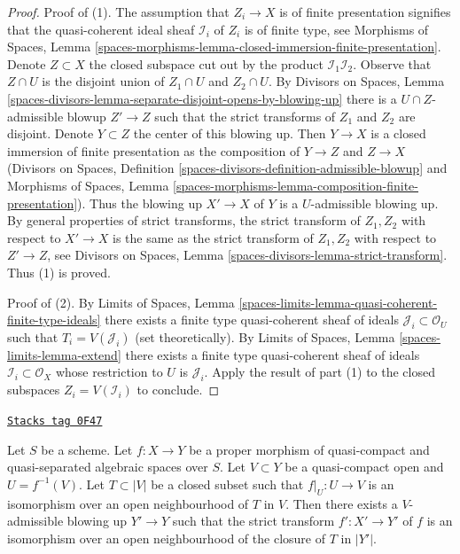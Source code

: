 \begin{proof}
Proof of (1). The assumption that $Z_i \to X$ is of finite presentation
signifies that the quasi-coherent ideal sheaf $\mathcal{I}_i$ of $Z_i$
is of finite type, see
Morphisms of Spaces, Lemma
\ref{spaces-morphisms-lemma-closed-immersion-finite-presentation}.
Denote $Z \subset X$ the closed subspace
cut out by the product $\mathcal{I}_1 \mathcal{I}_2$.
Observe that $Z \cap U$ is the disjoint union
of $Z_1 \cap U$ and $Z_2 \cap U$. By Divisors on Spaces, Lemma
\ref{spaces-divisors-lemma-separate-disjoint-opens-by-blowing-up}
there is a $U \cap Z$-admissible blowup $Z' \to Z$ such that
the strict transforms of $Z_1$ and $Z_2$ are disjoint.
Denote $Y \subset Z$ the center of this blowing up.
Then $Y \to X$ is a closed immersion of finite presentation as the composition
of $Y \to Z$ and $Z \to X$ (Divisors on Spaces, Definition
\ref{spaces-divisors-definition-admissible-blowup} and
Morphisms of Spaces, Lemma
\ref{spaces-morphisms-lemma-composition-finite-presentation}).
Thus the blowing up $X' \to X$ of $Y$ is a $U$-admissible blowing
up. By general properties of strict transforms, the
strict transform of $Z_1, Z_2$ with respect to $X' \to X$
is the same as the strict transform of $Z_1, Z_2$ with respect
to $Z' \to Z$, see
Divisors on Spaces, Lemma \ref{spaces-divisors-lemma-strict-transform}.
Thus (1) is proved.

\medskip\noindent
Proof of (2). By Limits of Spaces, Lemma
\ref{spaces-limits-lemma-quasi-coherent-finite-type-ideals}
there exists a finite type quasi-coherent sheaf of ideals
$\mathcal{J}_i \subset \mathcal{O}_U$ such that
$T_i = V(\mathcal{J}_i)$ (set theoretically).
By Limits of Spaces, Lemma \ref{spaces-limits-lemma-extend}
there exists a finite type quasi-coherent sheaf
of ideals $\mathcal{I}_i \subset \mathcal{O}_X$
whose restriction to $U$ is $\mathcal{J}_i$.
Apply the result of part (1) to the closed
subspaces $Z_i = V(\mathcal{I}_i)$ to conclude.
\end{proof}

\begin{lemma}
\label{spaces-pushouts-lemma-blowup-iso-along}
\href{https://stacks.math.columbia.edu/tag/0F47}{\texttt{Stacks tag 0F47}}

Let $S$ be a scheme. Let $f : X \to Y$ be a proper morphism of quasi-compact
and quasi-separated algebraic spaces over $S$. Let $V \subset Y$ be a
quasi-compact open and $U = f^{-1}(V)$. Let $T \subset |V|$ be a closed subset
such that $f|_U : U \to V$ is an isomorphism over an open neighbourhood of $T$
in $V$. Then there exists a $V$-admissible blowing up $Y' \to Y$ such that
the strict transform $f' : X' \to Y'$ of $f$ is an isomorphism over an open
neighbourhood of the closure of $T$ in $|Y'|$.
\end{lemma}

